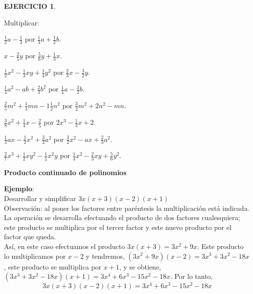 \documentclass[12pt,letterpaper]{article}
\theoremstyle{definition}
\newtheorem{ejer}{EJERCICIO}
\begin{document}
\vspace{1mm}

\begin{ejer}\

Multiplicar: %
\begin{enumerate}
\begin{multicols}{2}
\item $\frac{1}{2}a-\frac{1}{3}$ por $\frac{1}{3}a+\frac{1}{2}b$.
\item $x-\frac{2}{5}y$ por $\frac{5}{6}y+\frac{1}{3}x$.
\item $\frac{1}{2}x^2-\frac{1}{3}xy+\frac{1}{4}y^2$ por $\frac{2}{3}x-\frac{3}{2}y$.
\item $\frac{1}{4}a^2-ab+\frac{2}{3}b^2$ por $\frac{1}{4}a-\frac{3}{2}b$.
\item $\frac{2}{5}m^2+\frac{1}{3}mn-1\frac{1}{2}n^2$ por $\frac{3}{2}m^2+2n^2-mn$.
\item $\frac{3}{8}x^2+\frac{1}{4}x-\frac{2}{5}$ por $2x^3-\frac{1}{3}x+2$.
\item $\frac{1}{3}ax-\frac{1}{2}x^2+\frac{3}{2}a^2$ por $\frac{3}{2}x^2-ax+\frac{2}{3}a^2$.
\item $\frac{2}{7}x^3+\frac{1}{2}xy^2-\frac{1}{5}x^2y$ por $\frac{1}{4}x^2-\frac{2}{3}xy+\frac{5}{6}y^2$.
\end{multicols}
\end{enumerate}
\end{ejer}

\vspace{1mm}

\textbf{Producto continuado de polinomios} %

\textbf{Ejemplo}: \\
Desarrollar y simplificar $3x(x+3)(x-2)(x+1)$\\
Observación: al poner los factores entre paréntesis la multiplicación está indicada.\\
La operación se desarrolla efectuando el producto de dos factores cualesquiera; este producto se multiplica por el tercer factor y este nuevo producto por el factor que queda.\\
Así, en este caso efectuamos el producto $3x(x+3)=3x^2+9x$. Este producto lo multiplicamos por $x-2$ y tendremos, $(3x^2+9x)(x-2)=3x^3+3x^2-18x$, este producto se multiplica por $x+1$, y se obtiene, $(3x^3+3x^2-18x)(x+1)=3x^4+6x^3-15x^2-18x$. Por lo tanto,
\begin{equation*}
3x(x+3)(x-2)(x+1)=3x^4+6x^3-15x^2-18x
\end{equation*}
\end{document}
